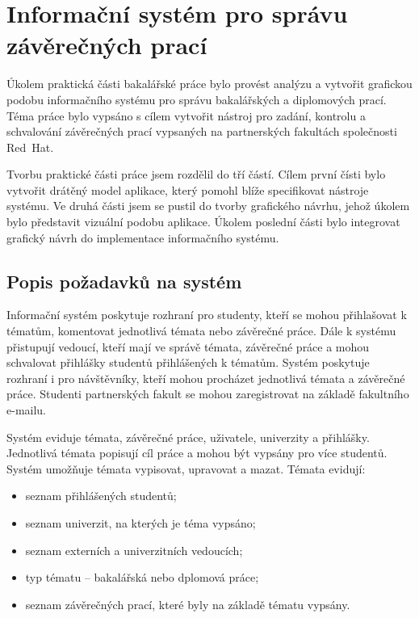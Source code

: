 \chapter{Informační systém pro správu závěrečných prací}

Úkolem praktická části bakalářské práce bylo provést analýzu a vytvořit grafickou podobu informačního systému pro správu bakalářských a diplomových prací. Téma práce bylo vypsáno s cílem vytvořit nástroj pro zadání, kontrolu a schvalování závěrečných prací vypsaných na partnerských fakultách společnosti Red~Hat.

Tvorbu praktické části práce jsem rozdělil do tří částí. Cílem první čísti bylo vytvořit drátěný model aplikace, který pomohl blíže specifikovat nástroje systému. Ve druhá části jsem se pustil do tvorby grafického návrhu, jehož úkolem bylo představit vizuální podobu aplikace. Úkolem poslední části bylo integrovat grafický návrh do implementace informačního systému.

\section{Popis požadavků na systém}

Informační systém poskytuje rozhraní pro studenty, kteří se mohou přihlašovat k tématům, komentovat jednotlivá témata nebo závěrečné práce. Dále k systému přistupují vedoucí, kteří mají ve správě témata, závěrečné práce a mohou schvalovat přihlášky studentů přihlášených k tématům. Systém poskytuje rozhraní i pro návštěvníky, kteří mohou procházet jednotlivá témata a závěrečné práce. Studenti partnerských fakult se mohou zaregistrovat na základě fakultního e-mailu.

Systém eviduje témata, závěrečné práce, uživatele, univerzity a přihlášky. Jednotlivá témata popisují cíl práce a mohou být vypsány pro více studentů. Systém umožňuje témata vypisovat, upravovat a mazat. Témata evidují:

\begin{itemize}
    \item seznam přihlášených studentů;
    \item seznam univerzit, na kterých je téma vypsáno;
    \item seznam externích a univerzitních vedoucích;
    \item typ tématu -- bakalářská nebo dplomová práce;
    \item seznam závěrečných prací, které byly na základě tématu vypsány.
\end{itemize}

